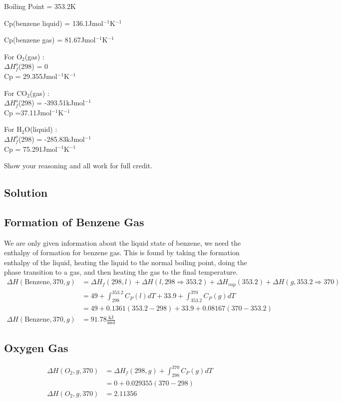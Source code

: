 \documentclass{article}
\newcommand{\be}{\begin{equation}}
\newcommand{\ee}{\end{equation}}
\begin{document}
Boiling Point = 353.2K
\bigskip

Cp(benzene liquid) = 136.1Jmol$^{-1}$K$^{-1}$
\bigskip

Cp(benzene gas) = 81.67Jmol$^{-1}$K$^{-1}$
\bigskip

For O$_2$(gas) : \\
$\Delta H^o_{f}$(298) = 0\\ 
Cp = 29.355Jmol$^{-1}$K$^{-1}$
\bigskip

For CO$_2$(gas) :\\
$\Delta H^o_{f}$(298) = -393.51kJmol$^{-1}$\\
Cp =37.11Jmol$^{-1}$K$^{-1}$
\bigskip

For H$_2$O(liquid) :\\
$\Delta H^o_{f}$(298) = -285.83kJmol$^{-1}$\\
Cp = 75.291Jmol$^{-1}$K$^{-1}$
\bigskip

Show your reasoning and all work for full credit.

\subsection*{Solution}
\subsection*{Formation of Benzene Gas}
We are only given information about the liquid state of benzene, we need the enthalpy of formation for benzene gas. 
This is found by taking the formation enthalpy of the liquid, heating the liquid to the normal boiling point, doing the phase transition to a  gas, and then heating the gas to the final temperature. 
\be
\begin{split}
\Delta H(\text{Benzene},370,g) &= \Delta H_f(298,l) + \Delta H(l,298\Rightarrow 353.2) + \Delta H_{vap}(353.2) + \Delta H(g, 353.2 \Rightarrow 370)\\
&= 49 + \int_{298}^{353.2} C_P(l)dT + 33.9 + \int_{353.2}^{370} C_P(g) dT \\ 
&= 49 + 0.1361(353.2-298) + 33.9 + 0.08167(370-353.2) \\
\Delta H(\text{Benzene},370,g) &= 91.78 \frac{\text{kJ}}{\text{mol}}
\end{split}
\ee

\subsection*{Oxygen Gas}


\be
\begin{split}
\Delta H(O_2,g, 370) &= \Delta H_f(298,g) + \int_{298}^{370} C_P(g)dT\\
&= 0 + 0.029355(370-298)\\
\Delta H(O_2,g, 370) &= 2.11356
\end{split}
\ee
\end{document}
